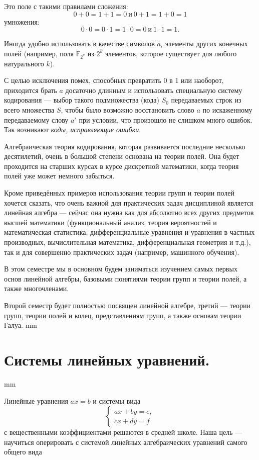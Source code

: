 \documentclass[12pt,english,russian]{article}
\begin{document}
	Это поле с такими правилами сложения:
	$$0 + 0 = 1 + 1 = 0 \ \text{и} \ 0 + 1 = 1 + 0 = 1$$
	умножения:
	$$0\cdot 0 = 0\cdot 1 = 1\cdot 0 = 0 \ \text{и} \ 1\cdot 1 = 1.$$

	Иногда удобно использовать в качестве символов $a_i$ элементы других конечных полей (например, поля $\mathbb F_{2^k}$
	из $2^k$ элементов, которое существует для любого натурального $k$).

	С целью исключения помех, способных превратить 0 в 1 или
	наоборот, приходится брать $a$ досаточно длинным и использовать
	специальную систему кодирования --- выбор такого подмножества (кода)
	$S_0$ передаваемых строк из всего множества $S$, чтобы было возможно восстановить слово $a$
	по искаженному передаваемому слову
	$a'$ при условии, что произошло не слишком много ошибок.
	Так возникают \textit{коды, исправляющие ошибки}.

	Алгебраическая теория кодирования, которая развивается последние 
	несколько десятилетий, очень в большой степени основана 
	на теории полей. Она будет проходится на старших курсах
	в курсе дискретной математики, когда теория полей уже может
	немного забыться.

	Кроме приведённых примеров использования теории групп и
	теории полей хочется сказать, что очень важной для практических 
	задач дисциплиной является линейная алгебра --- сейчас она
	нужна как для абсолютно всех других предметов высшей математики 
	(функциональный анализ, теория вероятностей и математическая 
	статистика, дифференциальные уравнения и уравнения в
	частных производных, вычислительная математика, дифференциальная геометрия и т.д.), так и для совершенно практических
	задач (например, машинного обучения).


	В этом семестре мы в основном будем заниматься изучением
	самых первых основ линейной алгебры, базовыми понятиями теории 
	групп и теории полей, а также многочленами.

	Второй семестр будет полностью посвящен линейной алгебре,
	третий --- теории групп, теории полей и колец, представлениям
	групп, а также основам теории Галуа.
	 mm
		\section {\bf Системы линейных уравнений.}
	 mm

	
	Линейные уравнения $ax = b$ и системы вида
	$$
		\begin{cases}
			ax + by =e,\\
			cx + dy = f
		\end{cases}
	$$
	с вещественными коэффициентами решаются в средней школе.
	Наша цель --- научиться оперировать с системой линейных алгебраических 
	уравнений самого общего вида
\end{document}
